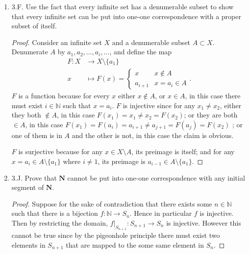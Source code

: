 \begin{enumerate}
\begin{proof}
	Therefore $a_n\ge b_n$ for all $n \in \mathbb{N}$. If $a_n>b _n$ then the interval is empty, so we have $I_n = \{x_n\} \subset \mathbf{F}$ for at most countable number of $I_n$, and the rest of them are empty. This is to say that the set $\mathbf{F}$ is at most countable. But we have concluded in Exercise 7.I that  $\mathbf{F}$ is not countable.
\end{proof}

	\item 3.F. Use the fact that every infinite set has a denumerable subset to show that every infinite set can be put into one-one correspondence with a proper subset of itself.
\begin{proof}
Consider an infinite set $X$ and a denumerable subset  $A\subset X$. Denumerate $A$ by $a_1, a_2, \ldots, a_i, \ldots$, and define the map \begin{align*}
	F: X &\longrightarrow X\setminus \{a_1\}  \\
	x &\longmapsto F(x) = \begin{cases}
		x & x \not\in A\\
		a_{i+1} & x = a_i \in A
	\end{cases}
.\end{align*}
$F$ is a function because for every $x$ either $x \not\in A$, or $x \in A$, in this case there must exist $i \in \mathbb{N}$ such that $x = a_i$. $F$ is injective since for any $x_1 \neq  x_2$, either they both  $\not\in  A$, in this case $F(x_1) = x_1 \neq  x_2 = F(x_2)$; or they are both $\in A$, in this case $F(x_1) = F(a_i) = a_{i+1} \neq a_{j+1} = F(a_j) = F(x_2)$ ; or one of them is in $A$ and the other is not, in this case the claim is obvious.

$F$ is surjective because for any $x \in X\setminus A$, its preimage is itself; and for any $x = a_i \in A\setminus \{a_1\} $ where $i \neq 1$, its preimage is $a_{i -1} \in A\setminus \{a_1\} $.
\end{proof}


\item 3.J. Prove that $\mathbf{N}$ cannot be put into one-one correspondence with any initial segment of $\mathbf{N}$.
\begin{proof}
Suppose for the sake of contradiction that there exists some $n \in \mathbb{N}$ such that there is a bijection $f: \mathbb{N} \to  S_n$. Hence in particular $f$ is injective. Then by restricting the domain, $f|_{S_{n+1}} : S_{n+1} \to  S_n$ is injective. However this cannot be true since by the pigeonhole principle there must exist two elements in $S_{n+1}$ that are mapped to the some same element in $S_n$.
\end{proof}

\end{enumerate}
